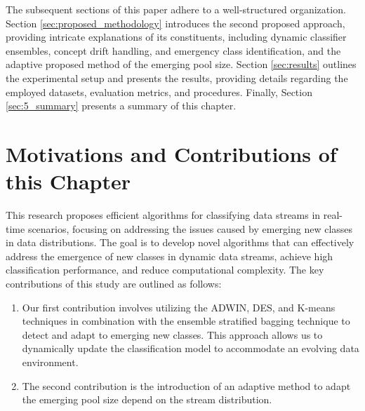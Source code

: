 The subsequent sections of this paper adhere to a well-structured organization. Section \ref{sec:proposed_methodology} introduces the second proposed approach, providing intricate explanations of its constituents, including dynamic classifier ensembles, concept drift handling, and emergency class identification, and the adaptive proposed method of the emerging pool size. Section \ref{sec:results} outlines the experimental setup and presents the results, providing details regarding the employed datasets, evaluation metrics, and procedures. Finally,  Section \ref{sec:5_summary} presents a summary of this chapter.
  
  
  \section{Motivations and Contributions of this Chapter} \label{sec:5_2_motivation}
  This research proposes efficient algorithms for classifying data streams in real-time scenarios, focusing on addressing the issues caused by emerging new classes in data distributions. The goal is to develop novel algorithms that can effectively address the emergence of new classes in dynamic data streams, achieve high classification performance, and reduce computational complexity. The key contributions of this study are outlined as follows:
  \begin{enumerate}[nosep]
    \item Our first contribution involves utilizing the ADWIN, DES, and K-means techniques in combination with the ensemble stratified bagging technique to detect and adapt to emerging new classes. This approach allows us to dynamically update the classification model to accommodate an evolving data environment.
   \item The second contribution is the introduction of an adaptive method to adapt the emerging pool size depend on the stream distribution.
    \end{enumerate} 
   
     
  
  
 
   

